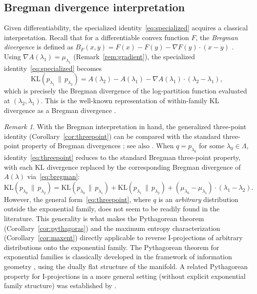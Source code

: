 \documentclass[11pt, a4paper, 
onecolumn, 
showabstract]{naverlabseurope-onecol-flex}
\theoremstyle{definition}
\theoremstyle{remark}
\newtheorem{remark}[theorem]{Remark}
\newcommand{\KL}[2]{\mathrm{KL}\!\left(#1 \,\|\, #2\right)}
\begin{document}
\subsection{Bregman divergence interpretation}

Given differentiability, the specialized identity~\eqref{eq:specialized} acquires a classical interpretation.
Recall that for a differentiable convex function $F$, the \emph{Bregman divergence} is defined as $B_F(x,y) = F(x) - F(y) - \nabla F(y) \cdot (x - y)$ \cite{Bregman1967}.
Using $\nabla A(\lambda_1) = \mu_{\lambda_1}$ (Remark~\ref{rem:gradient}), the specialized identity~\eqref{eq:specialized} becomes
\begin{equation}\label{eq:bregman}
    \KL{p_{\lambda_1}}{p_{\lambda_2}}
    = A(\lambda_2) - A(\lambda_1) - \nabla A(\lambda_1) \cdot (\lambda_2 - \lambda_1),
\end{equation}
which is precisely the Bregman divergence of the log-partition function evaluated at $(\lambda_2, \lambda_1)$.
This is the well-known representation of within-family KL divergence as a Bregman divergence \cite{Banerjee2005}.

\begin{remark}\label{rem:bregman_threepoint}
With the Bregman interpretation in hand, the generalized three-point identity (Corollary~\ref{cor:threepoint}) can be compared with the standard three-point property of Bregman divergences \cite{Banerjee2005}; see also \cite{Nielsen2010}.
When $q = p_{\lambda_0}$ for some $\lambda_0 \in \Lambda$, identity~\eqref{eq:threepoint} reduces to the standard Bregman three-point property, with each KL divergence replaced by the corresponding Bregman divergence of $A(\lambda)$ via~\eqref{eq:bregman}:
\[
    \KL{p_{\lambda_0}}{p_{\lambda_2}}
    = \KL{p_{\lambda_0}}{p_{\lambda_1}} + \KL{p_{\lambda_1}}{p_{\lambda_2}}
      + (\mu_{\lambda_0} - \mu_{\lambda_1}) \cdot (\lambda_1 - \lambda_2).
\]
However, the general form~\eqref{eq:threepoint}, where $q$ is an \emph{arbitrary} distribution outside the exponential family, does not seem to be readily found in the literature.
This generality is what makes the Pythagorean theorem (Corollary~\ref{cor:pythagoras}) and the maximum entropy characterization (Corollary~\ref{cor:maxent}) directly applicable to reverse I-projections of arbitrary distributions onto the exponential family.
The Pythagorean theorem for exponential families is classically developed in the framework of information geometry \cite{Amari1985,AmariNagaoka2000}, using the dually flat structure of the manifold.
A related Pythagorean property for I-projections in a more general setting (without explicit exponential family structure) was established by \cite{Csiszar1975}.
\end{remark}
\end{document}
